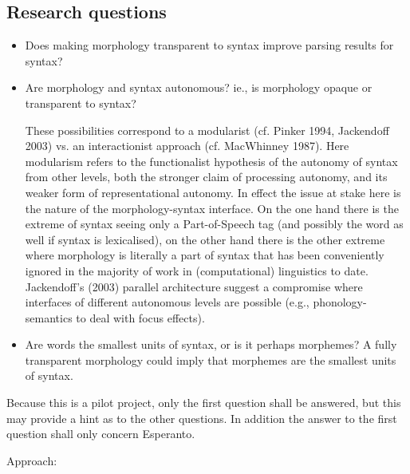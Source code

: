 \documentclass[10pt,a4paper]{article}
\begin{document}
\subsection{Research questions}

\begin{itemize}
\item Does making morphology transparent to syntax improve parsing results for
syntax?
\item Are morphology and syntax autonomous? ie., is morphology opaque or
transparent to syntax? 

These possibilities correspond to a modularist (cf.
Pinker 1994, Jackendoff 2003) vs. an interactionist approach (cf.  MacWhinney
1987). Here modularism refers to the functionalist hypothesis of the autonomy
of syntax from other levels, both the stronger claim of processing autonomy,
and its weaker form of representational autonomy. In effect the issue at stake
here is the nature of the morphology-syntax interface. On the one hand there is
the extreme of syntax seeing only a Part-of-Speech tag (and possibly the word
as well if syntax is lexicalised), on the other hand there is the other extreme
where morphology is literally a part of syntax that has been conveniently
ignored in the majority of work in (computational) linguistics to date.
Jackendoff's (2003) parallel architecture suggest a compromise where
interfaces of different autonomous levels are possible (e.g.,
phonology-semantics to deal with focus effects).

\item Are words the smallest units of syntax, or is it perhaps morphemes? A
fully transparent morphology could imply that morphemes are the smallest units
of syntax.
\end{itemize}

Because this is a pilot project, only the first question shall be answered,
but this may provide a hint as to the other questions. In addition the answer
to the first question shall only concern Esperanto.

Approach:
\end{document}
